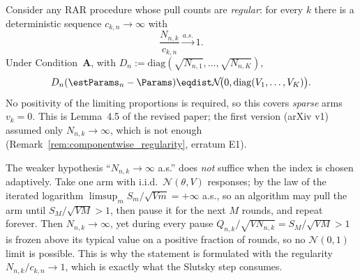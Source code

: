 \begin{lemma}\label{lem:componentwise}
\leanok
{}
Consider any RAR procedure whose pull counts are \emph{regular}: for every $k$ there is a
deterministic sequence $c_{k,n}\to\infty$ with
\[
  \frac{N_{n,k}}{c_{k,n}}\xrightarrow{a.s.}1 .
\]
Under Condition~\textbf{A}, with $D_n := \mathrm{diag}(\sqrt{N_{n,1}},\dots,\sqrt{N_{n,K}})$,
\[
  D_n(\estParams_n - \Params) \eqdist \mathcal{N}\!\big(0, \mathrm{diag}(V_1,\dots,V_K)\big).
\]
No positivity of the limiting proportions is required, so this covers \emph{sparse} arms $v_k=0$.
This is Lemma~4.5 of the revised paper; the first version (arXiv v1) assumed only
$N_{n,k}\to\infty$, which is not enough (Remark~\ref{rem:componentwise_regularity}, erratum E1).
\end{lemma}

\begin{remark}\label{rem:componentwise_regularity}
The weaker hypothesis ``$N_{n,k}\to\infty$ a.s.'' does \emph{not} suffice when the index is chosen
adaptively. Take one arm with i.i.d.\ $\mathcal N(\theta,V)$ responses; by the law of the iterated
logarithm $\limsup_m S_m/\sqrt{Vm}=+\infty$ a.s., so an algorithm may pull the arm until
$S_M/\sqrt{VM}>1$, then pause it for the next $M$ rounds, and repeat forever. Then
$N_{n,k}\to\infty$, yet during every pause $Q_{n,k}/\sqrt{V N_{n,k}}=S_M/\sqrt{VM}>1$ is frozen
above its typical value on a positive fraction of rounds, so no $\mathcal N(0,1)$ limit is possible.
This is why the statement is formulated with the regularity $N_{n,k}/c_{k,n}\to1$, which is exactly
what the Slutsky step consumes.
\end{remark}

